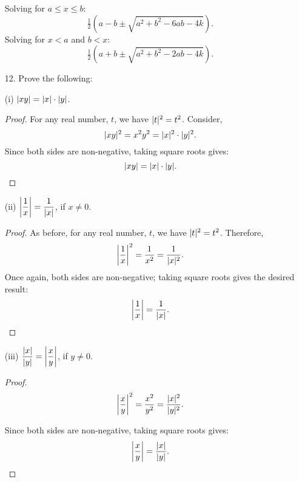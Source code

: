 \documentclass[11pt]{article}
\begin{document}
\begin{enumerate}
          Solving for $a \leq x \leq b$:
          \[
              \tfrac{1}{2} \left( a - b \pm \sqrt{a^2 + b^2 - 6ab - 4k} \right).
          \]
          Solving for $x < a$ and $b < x$:
          \[
              \tfrac{1}{2} \left( a + b \pm \sqrt{a^2 + b^2 - 2ab - 4k} \right).
          \]

    \item[12.] Prove the following:

    \item[(i)] $\lvert xy\rvert = \lvert x\rvert \cdot \lvert y\rvert$.
          \begin{proof}
              For any real number, $t$, we have $\lvert t\rvert^2 = t^2$.  Consider,
              \[
                  \lvert xy\rvert^2 = x^2 y^2 = \lvert x\rvert^2 \cdot \lvert y\rvert^2.
              \]
              Since both sides are non-negative, taking square roots gives:
              \[
                  \lvert xy\rvert = \lvert x\rvert \cdot \lvert y\rvert.
              \]
          \end{proof}

    \item[(ii)] $\left\lvert \dfrac{1}{x} \right\rvert = \dfrac{1}{\lvert x\rvert}$, if $x \neq 0$.
          \begin{proof}
              As before, for any real number, $t$, we have $\lvert t\rvert^2 = t^2$. Therefore,
              \[
                  \left\lvert \dfrac{1}{x} \right\rvert^2
                  = \dfrac{1}{x^2}
                  = \dfrac{1}{\lvert x\rvert^2}.
              \]
              Once again, both sides are non-negative; taking square roots gives the desired result:
              \[
                  \left\lvert \dfrac{1}{x} \right\rvert
                  = \dfrac{1}{\lvert x\rvert}.
              \]
          \end{proof}

    \item[(iii)] $\dfrac{\lvert x\rvert}{\lvert y\rvert} = \left\lvert \dfrac{x}{y} \right\rvert$, if $y \neq 0$.
          \begin{proof}
              \[
                  \left\lvert \dfrac{x}{y} \right\rvert^2 =
                  \dfrac{x^2}{y^2} =
                  \dfrac{\lvert x\rvert^2}{\lvert y\rvert^2}.
              \]

              Since both sides are non-negative, taking square roots gives:
              \[
                  \left\lvert \dfrac{x}{y} \right\rvert = \dfrac{\lvert x\rvert}{\lvert y\rvert}.
              \]
          \end{proof}

          \pagebreak


\end{enumerate}
\end{document}

